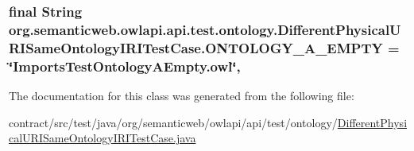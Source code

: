 \hypertarget{classorg_1_1semanticweb_1_1owlapi_1_1api_1_1test_1_1ontology_1_1_different_physical_u_r_i_same_ontology_i_r_i_test_case_a17758ea9f371210b47ba980cadb0c290}{
\subsubsection[{O\-N\-T\-O\-L\-O\-G\-Y\-\_\-\-A\-\_\-\-E\-M\-P\-T\-Y}]{\setlength{\rightskip}{0pt plus 5cm}final String org.\-semanticweb.\-owlapi.\-api.\-test.\-ontology.\-Different\-Physical\-U\-R\-I\-Same\-Ontology\-I\-R\-I\-Test\-Case.\-O\-N\-T\-O\-L\-O\-G\-Y\-\_\-\-A\-\_\-\-E\-M\-P\-T\-Y = \char`\"{}Imports\-Test\-Ontology\-A\-Empty.\-owl\char`\"{}\hspace{0.3cm}{\ttfamily [static]}, {\ttfamily [private]}}}\label{classorg_1_1semanticweb_1_1owlapi_1_1api_1_1test_1_1ontology_1_1_different_physical_u_r_i_same_ontology_i_r_i_test_case_a17758ea9f371210b47ba980cadb0c290}


The documentation for this class was generated from the following file\-:\begin{DoxyCompactItemize}
\item 
contract/src/test/java/org/semanticweb/owlapi/api/test/ontology/\hyperlink{_different_physical_u_r_i_same_ontology_i_r_i_test_case_8java}{Different\-Physical\-U\-R\-I\-Same\-Ontology\-I\-R\-I\-Test\-Case.\-java}\end{DoxyCompactItemize}
